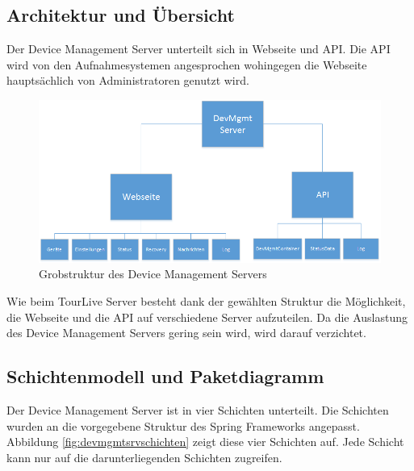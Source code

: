 \subsection{Architektur und Übersicht}
Der Device Management Server unterteilt sich in Webseite und API. Die API wird von den Aufnahmesystemen angesprochen wohingegen die Webseite hauptsächlich von Administratoren genutzt wird.



\begin{figure}[H]
	\centering
	\includegraphics[width=130mm]{images/devmgmtsrv/uebersicht.png}
	\caption{Grobstruktur des Device Management Servers}
\end{figure}

Wie beim TourLive Server besteht dank der gewählten Struktur die Möglichkeit, die Webseite und die API auf verschiedene Server aufzuteilen. Da die Auslastung des Device Management Servers gering sein wird, wird darauf verzichtet.

\subsection{Schichtenmodell und Paketdiagramm}
Der Device Management Server ist in vier Schichten unterteilt. Die Schichten wurden an die vorgegebene Struktur des Spring Frameworks angepasst. Abbildung \ref{fig:devmgmtsrvschichten} zeigt diese vier Schichten auf. Jede Schicht kann nur auf die darunterliegenden Schichten zugreifen.


